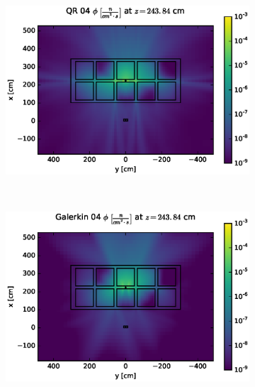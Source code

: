 \clearpage
\begin{figure}[!htb]
\begin{subfigure}{\textwidth}
\centering
\includegraphics[max height=0.445\textheight]
{img/cargo-plots/fwd/flux-qr04-slice.eps}
\end{subfigure}
\\
\begin{subfigure}{\textwidth}
\centering
\includegraphics[max height=0.445\textheight]
{img/cargo-plots/fwd/flux-gkn04-slice.eps}
\end{subfigure}
\end{figure}
\clearpage
